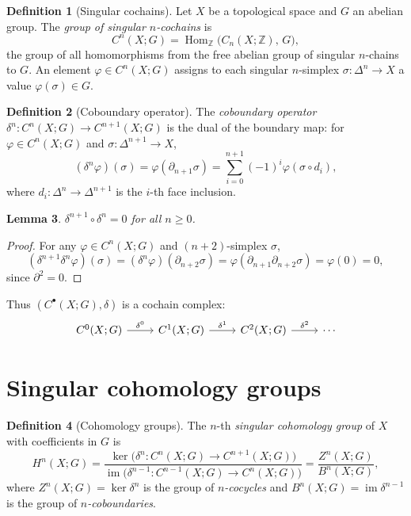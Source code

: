 \documentclass[12pt,a4paper,openany]{book}
\theoremstyle{definition}
\newtheorem{definition}{Definition}[chapter]
\theoremstyle{plain}
\newtheorem{lemma}[definition]{Lemma}
\theoremstyle{remark}
\newcommand{\Z}{\mathbb{Z}}
\DeclareMathOperator{\Hom}{Hom}
\DeclareMathOperator{\im}{im}
\begin{document}
\begin{definition}[Singular cochains]
Let $X$ be a topological space and $G$ an abelian group. The
\emph{group of singular $n$-cochains} is
\[
  C^n(X;G) = \Hom_\Z\bigl(C_n(X;\Z),\,G\bigr),
\]
the group of all homomorphisms from the free abelian group of singular
$n$-chains to $G$. An element $\varphi\in C^n(X;G)$ assigns to each
singular $n$-simplex $\sigma\colon\Delta^n\to X$ a value
$\varphi(\sigma)\in G$.
\end{definition}

\begin{definition}[Coboundary operator]
The \emph{coboundary operator}
$\delta^n\colon C^n(X;G)\to C^{n+1}(X;G)$ is the dual of the
boundary map: for $\varphi\in C^n(X;G)$ and
$\sigma\colon\Delta^{n+1}\to X$,
\[
  (\delta^n\varphi)(\sigma) = \varphi(\partial_{n+1}\sigma)
    = \sum_{i=0}^{n+1}(-1)^i \varphi(\sigma\circ d_i),
\]
where $d_i\colon\Delta^n\to\Delta^{n+1}$ is the $i$-th face inclusion.
\end{definition}

\begin{lemma}\label{lem:delta-squared}
$\delta^{n+1}\circ\delta^n = 0$ for all $n\geq 0$.
\end{lemma}

\begin{proof}
For any $\varphi\in C^n(X;G)$ and $(n+2)$-simplex $\sigma$,
\[
  (\delta^{n+1}\delta^n\varphi)(\sigma)
  = (\delta^n\varphi)(\partial_{n+2}\sigma)
  = \varphi(\partial_{n+1}\partial_{n+2}\sigma) = \varphi(0) = 0,
\]
since $\partial^2=0$.
\end{proof}

Thus $(C^\bullet(X;G),\delta)$ is a cochain complex:
\[
\begin{tikzcd}
  C^0(X;G) \ar[r,"\delta^0"]
  & C^1(X;G) \ar[r,"\delta^1"]
  & C^2(X;G) \ar[r,"\delta^2"]
  & \cdots
\end{tikzcd}
\]

\section{Singular cohomology groups}
\label{sec:cohomology-groups}

\begin{definition}[Cohomology groups]
The $n$-th \emph{singular cohomology group} of $X$ with coefficients
in $G$ is
\[
  H^n(X;G) = \frac{\ker\bigl(\delta^n\colon C^n(X;G)\to C^{n+1}(X;G)\bigr)}
    {\im\bigl(\delta^{n-1}\colon C^{n-1}(X;G)\to C^n(X;G)\bigr)}
  = \frac{Z^n(X;G)}{B^n(X;G)},
\]
where $Z^n(X;G)=\ker\delta^n$ is the group of \emph{$n$-cocycles}%
 and $B^n(X;G)=\im\delta^{n-1}$ is the group of
\emph{$n$-coboundaries}.
\end{definition}
\end{document}
